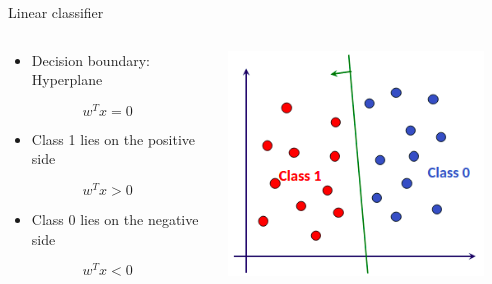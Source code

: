 \documentclass[aspectratio=169, 14pt]{beamer}
\begin{document}
\begin{frame}[t]{Linear classifier}
\begin{columns}
	\begin{column}{0.55\textwidth}
	\begin{itemize}
	  \item Decision boundary: Hyperplane
	\end{itemize}
	\[ w^{T} x=0 \]

	\begin{itemize}
	  \item Class 1 lies on the positive side
	\end{itemize}
	\[ w^{T} x>0 \]


	\begin{itemize}
	  \item Class 0 lies on the negative side
	\end{itemize}
        \[ w^{T} x<0 \]

	\end{column}
	\begin{column}{0.45\textwidth}
		\vskip-0.5cm
		\includegraphics[width=0.9\textwidth]{SVM_NonLinear_Images/AIML_SVM_IMG4.png}
	\end{column}
\end{columns}

\end{frame}
\end{document}
